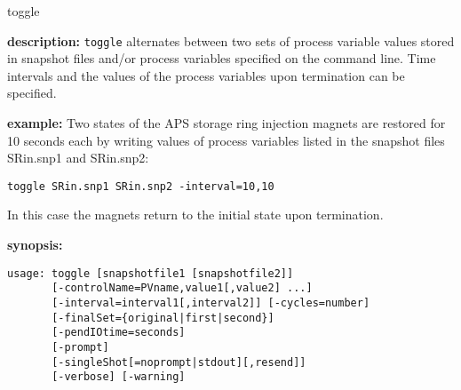 \begin{sddsprog}{toggle}
\item \textbf{description:}
\verb+toggle+ alternates between two sets of process variable values stored in 
snapshot files and/or
process variables specified on the command line.
Time intervals and the values of the process variables upon termination can be specified.
\item \textbf{example:} 
% 
Two states of the APS storage ring injection magnets are restored for 10 seconds each by writing
values of process variables listed in the snapshot files SRin.snp1 and SRin.snp2:
\begin{verbatim}
toggle SRin.snp1 SRin.snp2 -interval=10,10
\end{verbatim}
In this case the magnets return to the initial state upon termination.

\item \textbf{synopsis:} 
\begin{verbatim}
usage: toggle [snapshotfile1 [snapshotfile2]]
       [-controlName=PVname,value1[,value2] ...]
       [-interval=interval1[,interval2]] [-cycles=number]
       [-finalSet={original|first|second}]
       [-pendIOtime=seconds]
       [-prompt]
       [-singleShot[=noprompt|stdout][,resend]]
       [-verbose] [-warning]
\end{verbatim}


\end{sddsprog}
